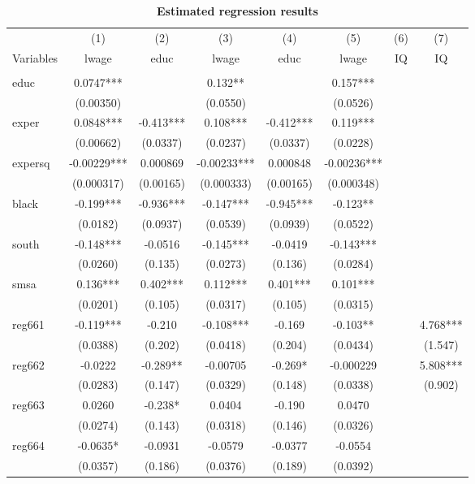 \documentclass[a4paper, 12pt, twoside]{article}
\begin{document}
\begin{table*}
\begin{center}
\caption{\textbf{Estimated regression results}}
\vspace{0.15in}
\begin{tabular}{lccccccc} \hline
 & (1) & (2) & (3) & (4) & (5) & (6) & (7) \\
Variables & lwage & educ & lwage & educ & lwage & IQ & IQ \\ \hline
 &  &  &  &  &  &  &  \\
educ & 0.0747*** &  & 0.132** &  & 0.157*** &  &  \\
 & (0.00350) &  & (0.0550) &  & (0.0526) &  &  \\
exper & 0.0848*** & -0.413*** & 0.108*** & -0.412*** & 0.119*** &  &  \\
 & (0.00662) & (0.0337) & (0.0237) & (0.0337) & (0.0228) &  &  \\
expersq & -0.00229*** & 0.000869 & -0.00233*** & 0.000848 & -0.00236*** &  &  \\
 & (0.000317) & (0.00165) & (0.000333) & (0.00165) & (0.000348) &  &  \\
black & -0.199*** & -0.936*** & -0.147*** & -0.945*** & -0.123** &  &  \\
 & (0.0182) & (0.0937) & (0.0539) & (0.0939) & (0.0522) &  &  \\
south & -0.148*** & -0.0516 & -0.145*** & -0.0419 & -0.143*** &  &  \\
 & (0.0260) & (0.135) & (0.0273) & (0.136) & (0.0284) &  &  \\
smsa & 0.136*** & 0.402*** & 0.112*** & 0.401*** & 0.101*** &  &  \\
 & (0.0201) & (0.105) & (0.0317) & (0.105) & (0.0315) &  &  \\
reg661 & -0.119*** & -0.210 & -0.108*** & -0.169 & -0.103** &  & 4.768*** \\
 & (0.0388) & (0.202) & (0.0418) & (0.204) & (0.0434) &  & (1.547) \\
reg662 & -0.0222 & -0.289** & -0.00705 & -0.269* & -0.000229 &  & 5.808*** \\
 & (0.0283) & (0.147) & (0.0329) & (0.148) & (0.0338) &  & (0.902) \\
reg663 & 0.0260 & -0.238* & 0.0404 & -0.190 & 0.0470 &  &  \\
 & (0.0274) & (0.143) & (0.0318) & (0.146) & (0.0326) &  &  \\
reg664 & -0.0635* & -0.0931 & -0.0579 & -0.0377 & -0.0554 &  &  \\
 & (0.0357) & (0.186) & (0.0376) & (0.189) & (0.0392) &  &  \\

\end{tabular}
\end{center}
\end{table*}
\end{document}
